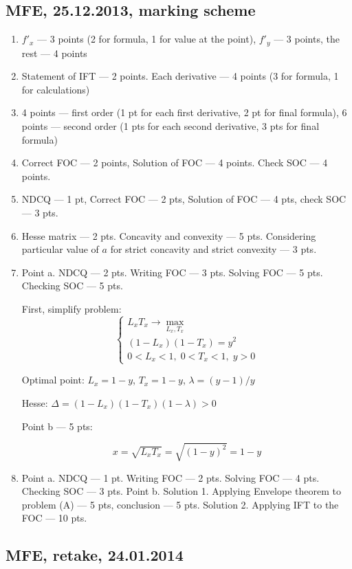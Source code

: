 \subsection{MFE, 25.12.2013, marking scheme}

\begin{enumerate}
\item $f'_x$ --- 3 points (2 for formula, 1 for value at  the point), $f'_y$ --- 3 points, the rest --- 4 points
\item Statement of IFT --- 2 points. Each derivative --- 4 points (3 for formula, 1 for calculations)
\item 4 points --- first order (1 pt for each first derivative, 2 pt for final formula), 6 points --- second order (1 pts for each second derivative, 3 pts for final formula)
\item Correct FOC --- 2 points, Solution of FOC --- 4 points. Check SOC --- 4 points.
\item NDCQ --- 1 pt, Correct FOC --- 2 pts, Solution of FOC --- 4 pts, check SOC --- 3 pts.
\item Hesse matrix --- 2 pts. Concavity and convexity --- 5 pts. Considering particular value of $a$ for strict concavity and strict convexity --- 3  pts.

\item Point a. NDCQ --- 2 pts. Writing FOC --- 3 pts. Solving FOC --- 5 pts. Checking SOC --- 5 pts.

First, simplify problem:
\[
\begin{cases}
L_xT_x \to \max_{L_x, T_x} \\
(1-L_x)(1-T_x)=y^2 \\
0<L_x<1, \; 0<T_x<1, \; y>0
\end{cases}
\]

Optimal point: $L_x=1-y$, $T_x=1-y$, $\lambda = (y-1)/y$

Hesse: $\Delta = (1-L_x)(1-T_x)(1-\lambda)>0$

Point b --- 5 pts:

\[
x=\sqrt{L_x T_x}=\sqrt{(1-y)^2}=1-y
\]


\item  Point a. NDCQ --- 1 pt. Writing FOC --- 2 pts. Solving FOC --- 4 pts. Checking SOC --- 3 pts. Point b. Solution 1. Applying Envelope theorem to problem (A) --- 5 pts, conclusion --- 5 pts. Solution 2. Applying IFT to the FOC --- 10 pts.

\end{enumerate}

\subsection{MFE, retake, 24.01.2014}

